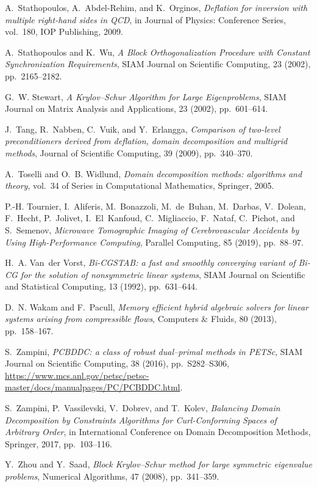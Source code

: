 \documentclass[3p,11pt]{elsarticle}
\begin{document}
\begin{thebibliography}{10}
{\sc A.~Stathopoulos, A.~Abdel-Rehim, and K.~Orginos}, {\em {Deflation for
  inversion with multiple right-hand sides in QCD}}, in Journal of Physics:
  Conference Series, vol.~180, IOP Publishing, 2009.

{\sc A.~Stathopoulos and K.~Wu}, {\em {A Block Orthogonalization Procedure with
  Constant Synchronization Requirements}}, SIAM Journal on Scientific
  Computing, 23 (2002), pp.~2165--2182.

{\sc G.~W. Stewart}, {\em {A Krylov--Schur Algorithm for Large Eigenproblems}},
  SIAM Journal on Matrix Analysis and Applications, 23 (2002), pp.~601--614.

{\sc J.~Tang, R.~Nabben, C.~Vuik, and Y.~Erlangga}, {\em Comparison of
  two-level preconditioners derived from deflation, domain decomposition and
  multigrid methods}, Journal of Scientific Computing, 39 (2009), pp.~340--370.

{\sc A.~Toselli and O.~B. Widlund}, {\em Domain decomposition methods:
  algorithms and theory}, vol.~34 of Series in Computational Mathematics,
  Springer, 2005.

{\sc P.-H. Tournier, I.~Aliferis, M.~Bonazzoli, M.~de~Buhan, M.~Darbas,
  V.~Dolean, F.~Hecht, P.~Jolivet, I.~El~Kanfoud, C.~Migliaccio, F.~Nataf,
  C.~Pichot, and S.~Semenov}, {\em {Microwave Tomographic Imaging of
  Cerebrovascular Accidents by Using High-Performance Computing}}, Parallel
  Computing, 85 (2019), pp.~88--97.

{\sc H.~A. Van~der Vorst}, {\em {Bi-CGSTAB: a fast and smoothly converging
  variant of Bi-CG for the solution of nonsymmetric linear systems}}, SIAM
  Journal on Scientific and Statistical Computing, 13 (1992), pp.~631--644.

{\sc D.~N. Wakam and F.~Pacull}, {\em Memory efficient hybrid algebraic solvers
  for linear systems arising from compressible flows}, Computers \& Fluids, 80
  (2013), pp.~158--167.

{\sc S.~Zampini}, {\em {PCBDDC: a class of robust dual--primal methods in
  PETSc}}, SIAM Journal on Scientific Computing, 38 (2016), pp.~S282--S306,
  \url{https://www.mcs.anl.gov/petsc/petsc-master/docs/manualpages/PC/PCBDDC.html}.

{\sc S.~Zampini, P.~Vassilevski, V.~Dobrev, and T.~Kolev}, {\em {Balancing
  Domain Decomposition by Constraints Algorithms for Curl-Conforming Spaces of
  Arbitrary Order}}, in International Conference on Domain Decomposition
  Methods, Springer, 2017, pp.~103--116.

{\sc Y.~Zhou and Y.~Saad}, {\em {Block Krylov--Schur method for large symmetric
  eigenvalue problems}}, Numerical Algorithms, 47 (2008), pp.~341--359.

\end{thebibliography}
\end{document}
